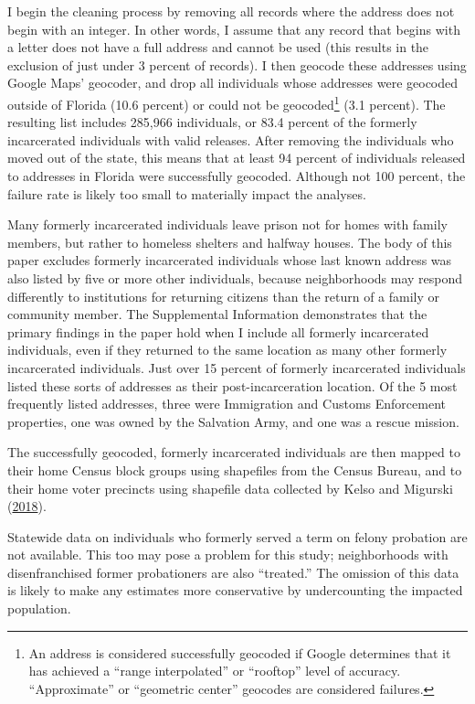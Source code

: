\documentclass[
  12pt,
]{article}
\begin{document}
I begin the cleaning process by removing all records where the address does not begin with an integer. In other words, I assume that any record that begins with a letter does not have a full address and cannot be used (this results in the exclusion of just under 3 percent of records). I then geocode these addresses using Google Maps' geocoder, and drop all individuals whose addresses were geocoded outside of Florida (10.6 percent) or could not be geocoded\footnote{An address is considered successfully geocoded if Google determines that it has achieved a ``range interpolated'' or ``rooftop'' level of accuracy. ``Approximate'' or ``geometric center'' geocodes are considered failures.} (3.1 percent). The resulting list includes 285,966 individuals, or 83.4 percent of the formerly incarcerated individuals with valid releases. After removing the individuals who moved out of the state, this means that at least 94 percent of individuals released to addresses in Florida were successfully geocoded. Although not 100 percent, the failure rate is likely too small to materially impact the analyses.

Many formerly incarcerated individuals leave prison not for homes with family members, but rather to homeless shelters and halfway houses. The body of this paper excludes formerly incarcerated individuals whose last known address was also listed by five or more other individuals, because neighborhoods may respond differently to institutions for returning citizens than the return of a family or community member. The Supplemental Information demonstrates that the primary findings in the paper hold when I include all formerly incarcerated individuals, even if they returned to the same location as many other formerly incarcerated individuals. Just over 15 percent of formerly incarcerated individuals listed these sorts of addresses as their post-incarceration location. Of the 5 most frequently listed addresses, three were Immigration and Customs Enforcement properties, one was owned by the Salvation Army, and one was a rescue mission.

The successfully geocoded, formerly incarcerated individuals are then mapped to their home Census block groups using shapefiles from the Census Bureau, and to their home voter precincts using shapefile data collected by Kelso and Migurski (\protect\hyperlink{ref-Kelso2018}{2018}).

Statewide data on individuals who formerly served a term on felony probation are not available. This too may pose a problem for this study; neighborhoods with disenfranchised former probationers are also ``treated.'' The omission of this data is likely to make any estimates more conservative by undercounting the impacted population.
\end{document}
